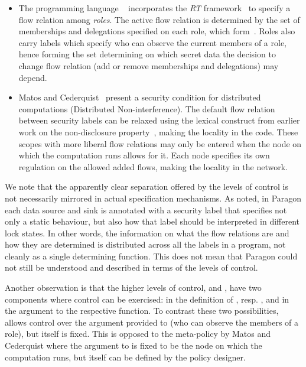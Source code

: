 \begin{itemize}
  \item The programming language \Rx{}~\cite{Swamy+:Managing} incorporates the \textit{RT} 
        framework~\cite{Li:Mitchell:Winsborough:Design} to specify a flow relation among \emph{roles}.
        The active flow relation is determined by the set of memberships and delegations specified on
        each role, which form~.
        Roles also carry labels which specify who can observe the current members of a role, hence
        forming the set  determining on which secret data the decision to change flow relation
        (add or remove memberships and delegations) may depend.
  
  \item Matos and Cederquist~\cite{Matos2014} present a security condition for distributed computations 
        (Distributed Non-interference). The default flow relation between security labels can be relaxed
        using the lexical construct from earlier work on the non-disclosure property~\cite{Boudol:Matos:On},
        making  the locality in the code.
        These scopes with more liberal flow relations may only be entered when the node on which the 
        computation runs allows for it. Each node specifies its own regulation on the allowed added flows,
        making  the locality in the network.
  
\end{itemize}

We note that the apparently clear separation offered by the levels of control is not necessarily mirrored 
in actual specification mechanisms. As noted, in Paragon each data source and sink is annotated with a
security label that specifies not only a static behaviour, but also how that label should be interpreted
in different lock states. In other words, the information on what the flow relations are and how they are
determined is distributed across all the labels in a program, not cleanly as a single determining function.
This does not mean that Paragon could not still be understood and described in terms of the levels of control.


Another observation is that the higher levels of control, \dynamicpol{} and \metapol{}, have two components
where control can be exercised: in the definition of \dynamicpol{}, resp. \metapol{}, and in the argument
to the respective function. To contrast these two possibilities, \Rx{} allows control over the argument
provided to \metapol{} (who can observe the members of a role), but \metapol{} itself is fixed.
This is opposed to the meta-policy by Matos and Cederquist where the argument to \metapol{} is fixed to
be the node on which the computation runs, but \metapol{} itself can be defined by the policy designer.

